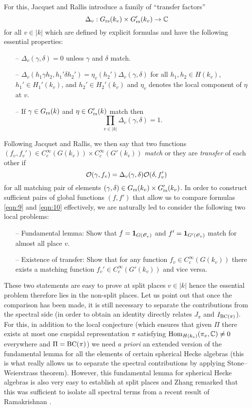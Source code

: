 For this, Jacquet and Rallis introduce a family of ``transfer factors''
\[
    \Delta_v: G_{\mathrm{rs}}(k_v) \times G_{\mathrm{rs}}'(k_v) \to \mathbb{C}
\]
for all $v \in |k|$ which are defined by explicit formulas and have the following essential properties:
\begin{itemize}
    \item[--] $\Delta_v(\gamma, \delta) = 0$ unless $\gamma$ and $\delta$ match.
    \item[--] $\Delta_v(h_1 \gamma h_2, h_1' \delta h_2') = \eta_v(h_2')\Delta_v(\gamma, \delta)$ for all $h_1, h_2 \in H(k_v)$, $h_1' \in H_1'(k_v)$, and $h_2' \in H_2'(k_v)$ and $\eta_v$ denotes the local component of $\eta$ at $v$.
    \item[--] If $\gamma \in G_{\mathrm{rs}}(k)$ and $\eta \in G_{\mathrm{rs}}'(k)$ match then
    \[
        \prod_{v \in |k|} \Delta_v(\gamma, \delta) = 1.
    \]
\end{itemize}

Following Jacquet and Rallis, we then say that two functions $(f_v, f_v') \in C_c^\infty(G(k_v)) \times C_c^\infty(G'(k_v))$ \emph{match} or they are \emph{transfer} of each other if
\[
    \mathcal{O}(\gamma, f_v) = \Delta_v(\gamma, \delta) \mathcal{O}(\delta, f_v')
\]
for all matching pair of elements $(\gamma, \delta) \in G_{\mathrm{rs}}(k_v) \times G_{\mathrm{rs}}'(k_v)$.
In order to construct sufficient pairs of global functions $(f, f')$ that allow us to compare formulas \eqref{eqn:9} and \eqref{eqn:10} effectively, we are naturally led to consider the following two local problems:
\begin{itemize}
    \item[--] Fundamental lemma: Show that $f = \mathbf{1}_{G(\mathscr{O}_v)}$ and $f' = \mathbf{1}_{G'(\mathscr{O}_v)}$ match for almost all place $v$.
    \item[--] Existence of transfer: Show that for any function $f_v \in C_c^\infty(G(k_v))$ there exists a matching function $f_v' \in C_c^\infty(G'(k_v))$ and vice versa.
\end{itemize}
These two statements are easy to prove at split places $v \in |k|$ hence the essential problem therefore lies in the non-split places.
Let us point out that once the comparison has been made, it is still necessary to separate the contributions from the spectral side (in order to obtain an identity directly relates $J_\pi$ and $I_{\mathrm{BC}(\pi)}$).
For this, in addition to the local conjecture (which ensures that given $\Pi$ there exists at most one cuspidal representation $\pi$ satisfying $\mathrm{Hom}_{H(k_v)}(\pi_v, \mathbb{C}) \neq 0$ everywhere and $\Pi = \mathrm{BC}(\pi)$) we need \emph{a priori} an extended version of the fundamental lemma for all the elements of certain spherical Hecke algebras (this is what really allows us to separate the spectral contributions by applying Stone--Weierstrass theorem).
However, this fundamental lemma for spherical Hecke algebras is also very easy to establish at split places and Zhang remarked that this was sufficient to isolate all spectral terms from a recent result of Ramakrishnan \cite{ramakrishnan2015mild}.


